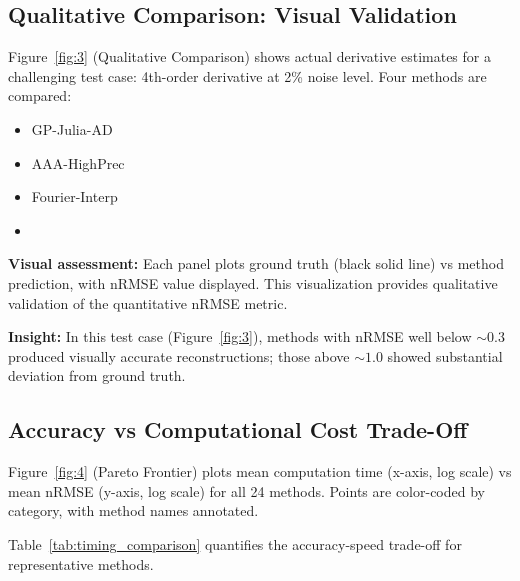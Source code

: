\subsection{Qualitative Comparison: Visual Validation}
\label{sec:qualitative}

Figure~\ref{fig:3} (Qualitative Comparison) shows actual derivative estimates for a challenging test case: 4th-order derivative at 2\% noise level. Four methods are compared:
\begin{itemize}
    \item GP-Julia-AD
    \item AAA-HighPrec
    \item Fourier-Interp
    \item {}
\end{itemize}

\textbf{Visual assessment:}
Each panel plots ground truth (black solid line) vs method prediction, with nRMSE value displayed. This visualization provides qualitative validation of the quantitative nRMSE metric.

\textbf{Insight:} In this test case (Figure~\ref{fig:3}), methods with nRMSE well below $\sim 0.3$ produced visually accurate reconstructions; those above $\sim 1.0$ showed substantial deviation from ground truth.

\subsection{Accuracy vs Computational Cost Trade-Off}
\label{sec:pareto}

Figure~\ref{fig:4} (Pareto Frontier) plots mean computation time (x-axis, log scale) vs mean nRMSE (y-axis, log scale) for all 24 methods. Points are color-coded by category, with method names annotated.

Table~\ref{tab:timing_comparison} quantifies the accuracy-speed trade-off for representative methods.

